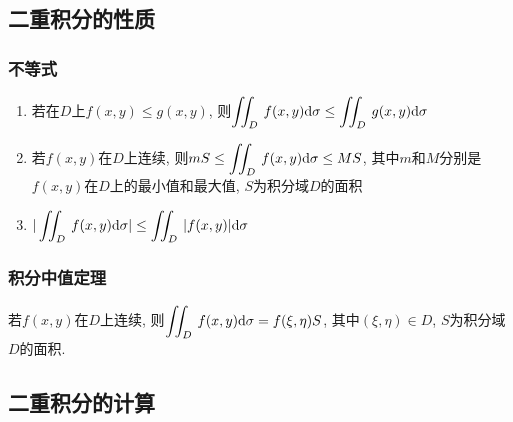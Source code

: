 \subsection{二重积分的性质}
\subsubsection{不等式}
\begin{enumerate}
\item 若在$ D $上$ f(x,y)\le g(x,y) $, 则$ \displaystyle\iint_{D}^{}\hspace{.2em}f(x,y)\mathrm{d}\sigma\le \displaystyle\iint_{D}^{}\hspace{.2em}g(x,y)\mathrm{d}\sigma $
\item 若$ f(x,y) $在$ D $上连续, 则$ mS\le \displaystyle\iint_{D}^{}\hspace{.2em}f(x,y)\mathrm{d}\sigma\le MS $, 其中$ m $和$ M $分别是$ f(x,y) $在$ D $上的最小值和最大值, $ S $为积分域$ D $的面积
\item $ |\displaystyle\iint_{D}^{}\hspace{.2em}f(x,y)\mathrm{d}\sigma|\le \displaystyle\iint_{D}^{}\hspace{.2em}|f(x,y)|\mathrm{d}\sigma $
\end{enumerate}
\subsubsection{积分中值定理}
若$ f(x,y) $在$ D $上连续, 则$ \displaystyle\iint_{D}\hspace{.2em}f(x,y)\mathrm{d}\sigma=f(\xi,\eta)S $, 其中$ (\xi,\eta)\in D $, $ S $为积分域$ D $的面积.
\subsection{二重积分的计算}
